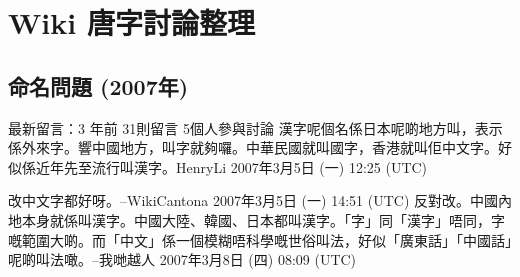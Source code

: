 \chapter{Wiki 唐字討論整理}

\section{命名問題 (2007年)}
最新留言：3 年前
31則留言
5個人參與討論
漢字呢個名係日本呢啲地方叫，表示係外來字。響中國地方，叫字就夠囉。中華民國就叫國字，香港就叫佢中文字。好似係近年先至流行叫漢字。HenryLi 2007年3月5日 (一) 12:25 (UTC)

改中文字都好呀。--WikiCantona 2007年3月5日 (一) 14:51 (UTC)
反對改。中國內地本身就係叫漢字。中國大陸、韓國、日本都叫漢字。「字」同「漢字」唔同，字嘅範圍大啲。而「中文」係一個模糊唔科學嘅世俗叫法，好似「廣東話」「中國話」呢啲叫法噉。--我哋越人 2007年3月8日 (四) 08:09 (UTC)


